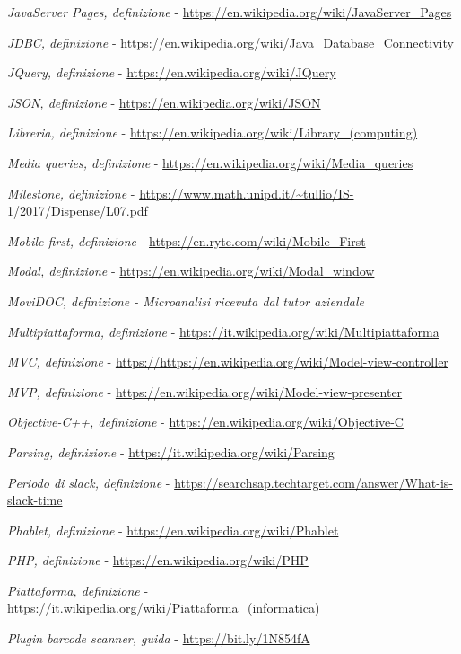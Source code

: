 \begin{enumerate}[label={[\arabic*]}]
	\item \textit{JavaServer Pages, definizione} - \url{https://en.wikipedia.org/wiki/JavaServer_Pages}
	\item \textit{JDBC, definizione} - \url{https://en.wikipedia.org/wiki/Java_Database_Connectivity}
	\item \textit{JQuery, definizione} - \url{https://en.wikipedia.org/wiki/JQuery}
	\item \textit{JSON, definizione} - \url{https://en.wikipedia.org/wiki/JSON}
	\item \textit{Libreria, definizione} - \url{https://en.wikipedia.org/wiki/Library_(computing)}
	\item \textit{Media queries, definizione} - \url{https://en.wikipedia.org/wiki/Media_queries}
	\item \textit{Milestone, definizione} - \url{https://www.math.unipd.it/~tullio/IS-1/2017/Dispense/L07.pdf}
	\item \textit{Mobile first, definizione} - \url{https://en.ryte.com/wiki/Mobile_First}
	\item \textit{Modal, definizione} - \url{https://en.wikipedia.org/wiki/Modal_window}
	\item \textit{MoviDOC, definizione - Microanalisi ricevuta dal tutor aziendale}
	\item \textit{Multipiattaforma, definizione} - \url{https://it.wikipedia.org/wiki/Multipiattaforma}
	\item \textit{MVC, definizione} - \url{https://https://en.wikipedia.org/wiki/Model-view-controller}
	\item \textit{MVP, definizione} - \url{https://en.wikipedia.org/wiki/Model-view-presenter}
	\item \textit{Objective-C++, definizione}  - \url{https://en.wikipedia.org/wiki/Objective-C}
	\item \textit{Parsing, definizione} - \url{https://it.wikipedia.org/wiki/Parsing}
	\item \textit{Periodo di slack, definizione} - \url{https://searchsap.techtarget.com/answer/What-is-slack-time}
	\item \textit{Phablet, definizione} - \url{https://en.wikipedia.org/wiki/Phablet}
	\item \textit{PHP, definizione} - \url{https://en.wikipedia.org/wiki/PHP}
	\item \textit{Piattaforma, definizione} - \url{https://it.wikipedia.org/wiki/Piattaforma_(informatica)}
	\item \textit{Plugin barcode scanner, guida} - \url{https://bit.ly/1N854fA}

\end{enumerate}
